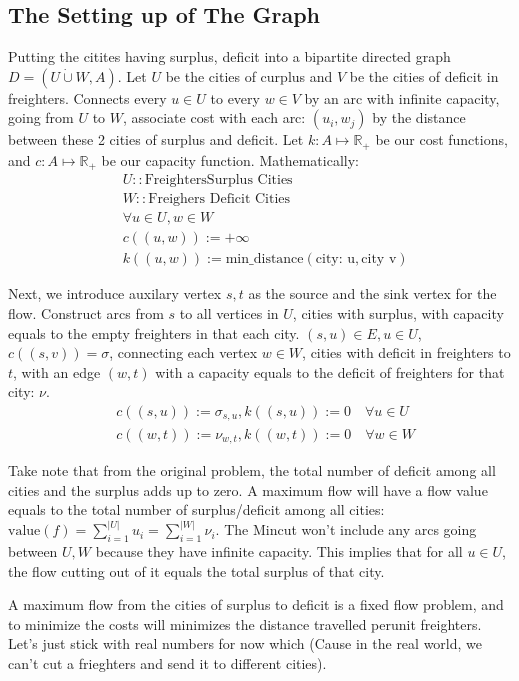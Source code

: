 \documentclass[]{article}
\theoremstyle{definition}
\begin{document}
    \subsection{The Setting up of The Graph}
        Putting the citites having surplus, deficit into a bipartite directed graph $D = (U\dot\cup W, A)$. Let $U$ be the cities of curplus and $V$ be the cities of deficit in freighters. Connects every $u\in U$ to every $w\in V$ by an arc with infinite capacity, going from $U$ to $W$, associate cost with each arc: $(u_i, w_j)$ by the distance between these 2 cities of surplus and deficit. Let $k: A \mapsto \mathbb R_+$ be our cost functions, and $c: A\mapsto \mathbb R_+$ be our capacity function. Mathematically: 
        \begin{align}
            & U:: \text{FreightersSurplus Cities}
            \\
            & W::\text{Freighers Deficit Cities}
            \\
            & \forall u\in U, w\in W
            \\
            & c((u, w)) := +\infty
            \\
            & k((u, w)) := \text{min\_distance}(\text{city: u}, \text{city v})
        \end{align}
        \par
        Next, we introduce auxilary vertex $s, t$ as the source and the sink vertex for the flow. Construct arcs from $s$ to all vertices in $U$, cities with surplus, with capacity equals to the empty freighters in that each city. $(s, u)\in E, u\in U$, $c((s, v)) = \sigma$, connecting each vertex $w\in W$, cities with deficit in freighters to $t$, with an edge $(w, t)$ with a capacity equals to the deficit of freighters for that city: $\nu$. 
        \begin{align}
            & c((s, u)) := \sigma_{s, u}, k((s, u)) := 0 \quad \forall u \in U
            \\
            & c((w, t)) := \nu_{w, t}, k((w, t)) := 0\quad \forall w\in W
        \end{align}
        \par
        Take note that from the original problem, the total number of deficit among all cities and the surplus adds up to zero. A maximum flow will have a flow value equals to the total number of surplus/deficit among all cities: $\text{value}(f) = \sum_{i= 1}^{|U|}u_i = \sum_{i = 1}^{|W|}\nu_i$. The Mincut won't include any arcs going between $U, W$ because they have infinite capacity. This implies that for all $u\in U$, the flow cutting out of it equals the total surplus of that city. 
        \par
        A maximum flow from the cities of surplus to deficit is a fixed flow problem, and to minimize the costs will minimizes the distance travelled perunit freighters. Let's just stick with real numbers for now which (Cause in the real world, we can't cut a frieghters and send it to different cities).
\end{document}
